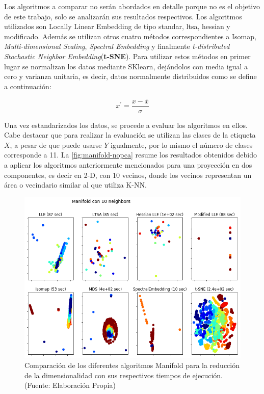 Los algoritmos a comparar no serán abordados en detalle porque no es el objetivo de este trabajo, solo se analizarán sus resultados respectivos. Los algoritmos utilizados son Locally Linear Embedding de tipo standar, ltsa, hessian y modificado. Además se utilizan otros cuatro métodos correspondientes a Isomap, \textit{Multi-dimensional Scaling}, \textit{Spectral Embedding} y finalmente \textit{t-distributed Stochastic Neighbor Embedding}(\textbf{t-SNE}). Para utilizar estos métodos en primer lugar se normalizan los datos mediante SKlearn, dejándolos con media igual a cero y varianza unitaria, es decir, datos normalmente distribuidos como se define a continuación:

\begin{equation} 
x^{'} = \frac{x- \overline{x}}{\sigma}
\end{equation}

Una vez estandarizados los datos, se procede a evaluar los algoritmos en ellos. Cabe destacar que para realizar la evaluación se utilizan las clases de la etiqueta $X$, a pesar de que puede usarse $Y$ igualmente, por lo mismo el número de clases corresponde a 11. La \autoref{fig:manifold-nopca} resume los resultados obtenidos debido a aplicar los algoritmos anteriormente mencionados para una proyección en dos componentes, es decir en 2-D, con 10 vecinos, donde los vecinos representan un área o vecindario similar al que utiliza K-NN.

\newpage

\begin{figure}[ht!]
\centering
\includegraphics[width=.6\textwidth]{figures/manifold.png}
\caption[Comparación de los diferentes algoritmos Manifold Learning]{Comparación de los diferentes algoritmos Manifold para la reducción de la dimensionalidad con sus respectivos tiempos de ejecución. \\
{\scriptsize (Fuente: Elaboración Propia)}}
\label{fig:manifold-nopca}
\end{figure}


